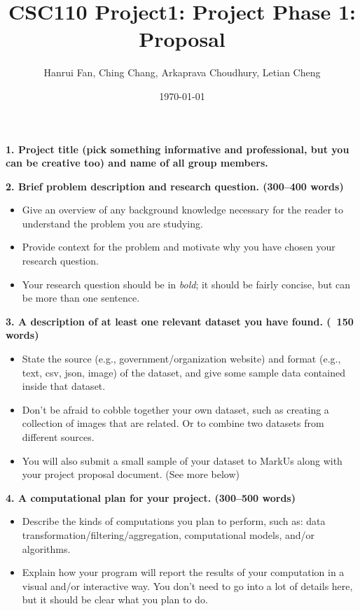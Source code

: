 \documentclass[fontsize=11pt]{article}
\title{CSC110 Project1: Project Phase 1: Proposal}
\author{Hanrui Fan, Ching Chang, Arkaprava Choudhury, Letian Cheng}
\date{\today}
\begin{document}
\maketitle

\textbf{\large 1. Project title (pick something informative and professional, but you can be creative too) and name of all group members.}

\textbf{\large 2. Brief problem description and research question. (300–400 words)}

\begin{itemize}
  \item Give an overview of any background knowledge necessary for the reader to understand the problem you are studying.
  \item Provide context for the problem and motivate why you have chosen your research question.
  \item Your research question should be in \emph{bold}; it should be fairly concise, but can be more than one sentence.
\end{itemize}


\textbf{\large 3. A description of at least one relevant dataset you have found. (~150 words)}

\begin{itemize}
    \item State the source (e.g., government/organization website) and format (e.g., text, csv, json, image) of the dataset, and give some sample data contained inside that dataset.
    \item Don’t be afraid to cobble together your own dataset, such as creating a collection of images that are related. Or to combine two datasets from different sources.
    \item You will also submit a small sample of your dataset to MarkUs along with your project proposal document. (See more below)
\end{itemize}

\textbf{\large 4. A computational plan for your project. (300–500 words)}

\begin{itemize}
    \item Describe the kinds of computations you plan to perform, such as: data transformation/filtering/aggregation, computational models, and/or algorithms.
    \item Explain how your program will report the results of your computation in a visual and/or interactive way. You don’t need to go into a lot of details here, but it should be clear what you plan to do.
\end{itemize}
\end{document}
